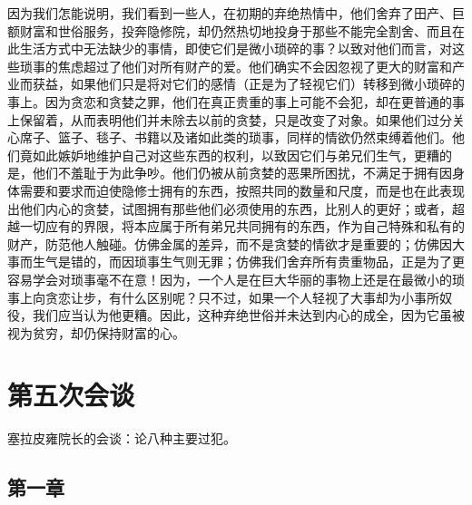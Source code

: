 因为我们怎能说明，我们看到一些人，在初期的弃绝热情中，他们舍弃了田产、巨额财富和世俗服务，投奔隐修院，却仍然热切地投身于那些不能完全割舍、而且在此生活方式中无法缺少的事情，即使它们是微小琐碎的事？以致对他们而言，对这些琐事的焦虑超过了他们对所有财产的爱。他们确实不会因忽视了更大的财富和产业而获益，如果他们只是将对它们的感情（正是为了轻视它们）转移到微小琐碎的事上。因为贪恋和贪婪之罪，他们在真正贵重的事上可能不会犯，却在更普通的事上保留着，从而表明他们并未除去以前的贪婪，只是改变了对象。如果他们过分关心席子、篮子、毯子、书籍以及诸如此类的琐事，同样的情欲仍然束缚着他们。他们竟如此嫉妒地维护自己对这些东西的权利，以致因它们与弟兄们生气，更糟的是，他们不羞耻于为此争吵。他们仍被从前贪婪的恶果所困扰，不满足于拥有因身体需要和要求而迫使隐修士拥有的东西，按照共同的数量和尺度，而是也在此表现出他们内心的贪婪，试图拥有那些他们必须使用的东西，比别人的更好；或者，超越一切应有的界限，将本应属于所有弟兄共同拥有的东西，作为自己特殊和私有的财产，防范他人触碰。仿佛金属的差异，而不是贪婪的情欲才是重要的；仿佛因大事而生气是错的，而因琐事生气则无罪；仿佛我们舍弃所有贵重物品，正是为了更容易学会对琐事毫不在意！因为，一个人是在巨大华丽的事物上还是在最微小的琐事上向贪恋让步，有什么区别呢？只不过，如果一个人轻视了大事却为小事所奴役，我们应当认为他更糟。因此，这种弃绝世俗并未达到内心的成全，因为它虽被视为贫穷，却仍保持财富的心。\par



\section{第五次会谈}

\par

塞拉皮雍院长的会谈：论八种主要过犯。\par


\subsection{第一章}

\par

